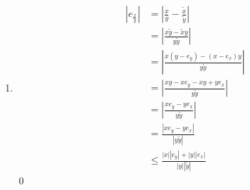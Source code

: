 \documentclass[fleqn, a4paper, 11pt, oneside]{amsart}
\theoremstyle{definition}
\theoremstyle{theorem}
\begin{document}
\begin{solution}
	\begin{enumerate}[leftmargin=*]
		\item
			\begin{align*}
				\left| e_{\frac{x}{y}} \right| & = \left| \frac{x}{y} - \frac{\tilde{x}}{\tilde{y}} \right|     \\
                                                               & = \left| \frac{x \tilde{y} - \tilde{x} y}{y \tilde{y}} \right| \\
                                                               & = \left| \frac{x (y - e_y) - (x - e_x) y}{y \tilde{y}} \right| \\
                                                               & = \left| \frac{x y - x e_y - x y + y e_x}{y \tilde{y}} \right| \\
                                                               & = \left| \frac{x e_y - y e_x}{y \tilde{y}} \right|             \\
                                                               & = \frac{|x e_y - y e_x|}{|y \tilde{y}|}                        \\
                                                               & \le \frac{|x| |e_y| + |y| |e_x|}{|y| |\tilde{y}|}
			\end{align*}
			\qed
	\end{enumerate}
\end{solution}
\end{document}
